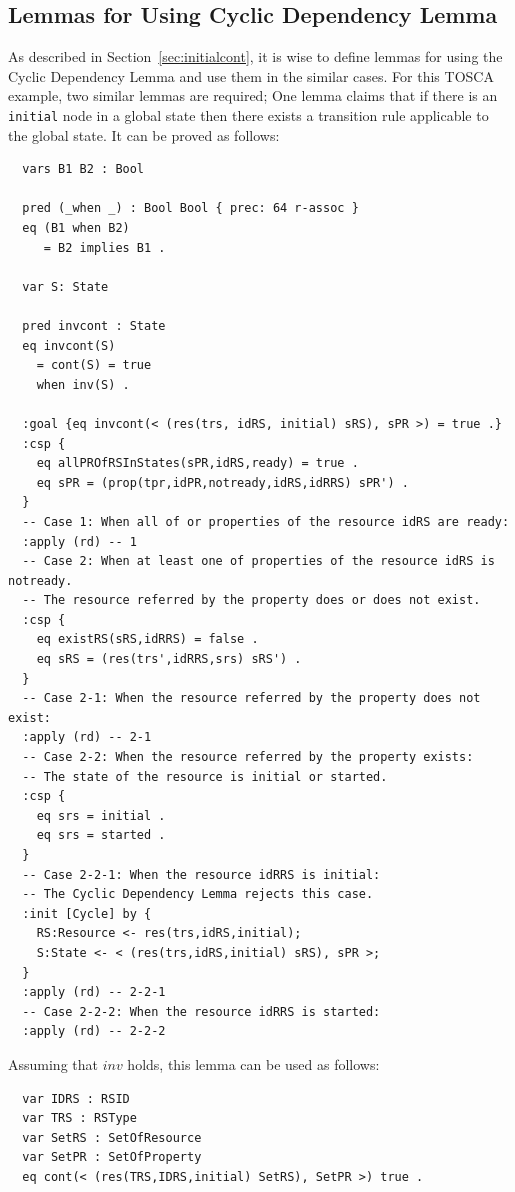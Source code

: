 \documentclass[12pt]{report}
\begin{document}
\subsection{Lemmas for Using Cyclic Dependency Lemma}
\label{sec:TOSCAcont}
As described in Section~\ref{sec:initialcont}, it is wise to define
lemmas for using the Cyclic Dependency Lemma and use them in the
similar cases. For this TOSCA example, two similar lemmas are
required; One lemma claims that if there is an {\tt initial} node in a
global state then there exists a transition rule applicable to the
global state. It can be proved as follows:
\small
\begin{verbatim}
  vars B1 B2 : Bool

  pred (_when _) : Bool Bool { prec: 64 r-assoc }
  eq (B1 when B2)
     = B2 implies B1 .

  var S: State

  pred invcont : State
  eq invcont(S) 
    = cont(S) = true
    when inv(S) .

  :goal {eq invcont(< (res(trs, idRS, initial) sRS), sPR >) = true .}
  :csp { 
    eq allPROfRSInStates(sPR,idRS,ready) = true .
    eq sPR = (prop(tpr,idPR,notready,idRS,idRRS) sPR') .
  }
  -- Case 1: When all of or properties of the resource idRS are ready:
  :apply (rd) -- 1
  -- Case 2: When at least one of properties of the resource idRS is notready.
  -- The resource referred by the property does or does not exist.
  :csp {
    eq existRS(sRS,idRRS) = false .
    eq sRS = (res(trs',idRRS,srs) sRS') .
  }
  -- Case 2-1: When the resource referred by the property does not exist:
  :apply (rd) -- 2-1
  -- Case 2-2: When the resource referred by the property exists:
  -- The state of the resource is initial or started.
  :csp { 
    eq srs = initial .
    eq srs = started .
  }
  -- Case 2-2-1: When the resource idRRS is initial:
  -- The Cyclic Dependency Lemma rejects this case.
  :init [Cycle] by {
    RS:Resource <- res(trs,idRS,initial);
    S:State <- < (res(trs,idRS,initial) sRS), sPR >;
  }
  :apply (rd) -- 2-2-1
  -- Case 2-2-2: When the resource idRRS is started:
  :apply (rd) -- 2-2-2
\end{verbatim}
\normalsize
Assuming that $inv$ holds, this lemma can be used as follows:
\small
\begin{verbatim}
  var IDRS : RSID 
  var TRS : RSType
  var SetRS : SetOfResource
  var SetPR : SetOfProperty
  eq cont(< (res(TRS,IDRS,initial) SetRS), SetPR >) true .
\end{verbatim}
\end{document}
